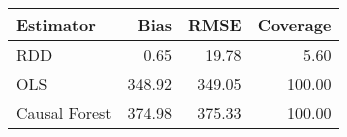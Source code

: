 \begin{table}[ht]
\centering
\begin{tabular}{lrrr}
  \hline
Estimator & Bias & RMSE & Coverage \\ 
  \hline
RDD & 0.65 & 19.78 & 5.60 \\ 
  OLS & 348.92 & 349.05 & 100.00 \\ 
  Causal Forest & 374.98 & 375.33 & 100.00 \\ 
   \hline
\end{tabular}
\end{table}
